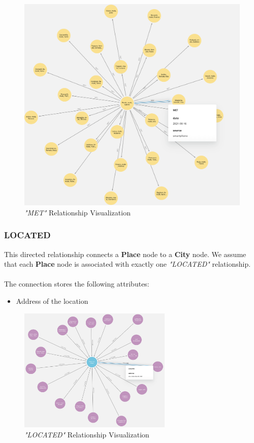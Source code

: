 \documentclass{article}[IEEEtran]
\begin{document}
\begin{figure}[H]
\begin{center}
\includegraphics[width=0.7\linewidth, frame]{MET.png}
\caption{\emph{"MET"} Relationship Visualization}
\end{center}
\end{figure}


\subsubsection{LOCATED}

This directed relationship connects a \textbf{Place} node to a \textbf{City} node. We assume that each \textbf{Place} node is associated with exactly one \emph{"LOCATED"} relationship.
\\\\
The connection stores the following attributes: 
\begin{itemize}
    \item Address of the location
\end{itemize}

\begin{figure}[H]
\begin{center}
\includegraphics[width=0.65\textwidth, frame]{LOCATED.png}
\caption{\emph{"LOCATED"} Relationship Visualization}
\end{center}
\end{figure}
\end{document}
